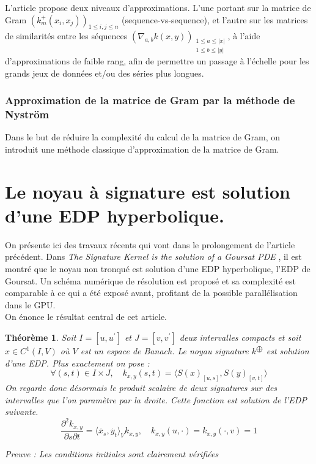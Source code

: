 \documentclass[10pt,a4paper]{article}
\newtheorem{theoreme}{Théorème}
\begin{document}
L'article propose deux niveaux d'approximations. L'une portant sur la matrice de Gram $(k_m^+ (x_i , x_j))_{1\leq i, j \leq n}$ (sequence-vs-sequence), et l'autre sur les matrices de similarités entre les séquences $\left( \nabla_{a, b} k(x,y) \right)_{\substack{1\leq a \leq |x| \\1\leq b \leq |y| }}$, à l'aide d'approximations de faible rang, afin de permettre un passage à l'échelle pour les grands jeux de données et/ou des séries plus longues.

\subsubsection{Approximation de la matrice de Gram par la méthode de Nyström}
Dans le but de réduire la complexité du calcul de la matrice de Gram, on introduit une méthode classique d'approximation de la matrice de Gram.\cite{nystrom}



\section{Le noyau à signature est solution d'une EDP hyperbolique.}

On présente ici des travaux récents qui vont dans le prolongement de l'article précédent. Dans \textit{The Signature Kernel is the solution of a Goursat PDE} \cite{goursat}, il est montré que le noyau non tronqué est solution d'une EDP hyperbolique, l'EDP de Goursat. Un schéma numérique de résolution est proposé et sa complexité est comparable à ce qui a été exposé avant, profitant de la possible parallélisation dans le GPU. \\

On énonce le résultat central de cet article.
\begin{theoreme}
Soit $I=[u, u^{'} ]$ et $J = [v, v^{'} ]$ deux intervalles compacts et soit $x \in C^1 (I,V)$ où $V$ est un espace de Banach. Le noyau signature $k^{\bigoplus}$ est solution d'une EDP. Plus exactement on pose :
\[ \forall (s,t) \in I\times J, \quad k_{x,y}(s,t) = \langle S(x)_{[u, s]} , S(y)_{[v, t]} \rangle
\]
On regarde donc désormais le produit scalaire de deux signatures sur des intervalles que l'on paramètre par la droite. Cette fonction est solution de l'EDP suivante.
\[
\frac{\partial^2 k_{x,y}}{\partial s \partial t} = \langle \dot{x_s}, \dot{y_t} \rangle_V k_{x,y}, \quad k_{x,y}(u, \cdot) = k_{x,y}(\cdot , v) = 1
\]

Preuve :
Les conditions initiales sont clairement vérifiées 
\[
\]


\end{theoreme}


\end{document}

